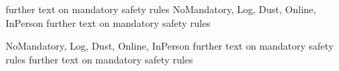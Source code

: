 \documentclass[11pt, oneside]{book}
\begin{document}
further text on mandatory safety rules
        {NoMandatory, Log, Dust, Online, InPerson}%
        {further text on mandatory safety rules}
        {%
        }
        {%
}  


        {NoMandatory, Log, Dust, Online, InPerson}%
        {further text on mandatory safety rules}
        {%
        }further text on mandatory safety rules
        {%
}  
\end{document}
